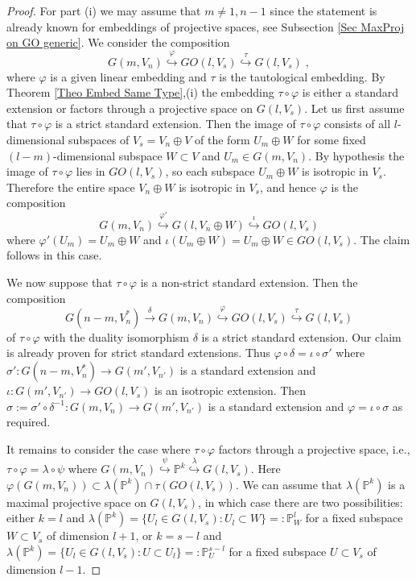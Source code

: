 \documentclass[12pt]{amsart}
\def\PP {{\mathbb P}}     %
\begin{document}
\begin{proof} For part (i) we may assume that $m\ne 1,n-1$ since the statement is already known for embeddings of projective spaces, see Subsection \ref{Sec MaxProj on GO generic}. We consider the composition
$$
G(m,V_n) \stackrel{\varphi}{\hookrightarrow} GO(l,V_s) \stackrel{\tau}{\hookrightarrow} G(l,V_s) \;,
$$
where $\varphi$ is a given linear embedding and $\tau$ is the tautological embedding. By Theorem \ref{Theo Embed Same Type},(i) the embedding $\tau\circ\varphi$ is either a standard extension or factors through a projective space on $G(l,V_s)$. Let us first assume that $\tau\circ\varphi$ is a strict standard extension. Then the image of $\tau\circ\varphi$ consists of all $l$-dimensional subspaces of $V_s=V_n\oplus V$ of the form $U_m\oplus W$ for some fixed $(l-m)$-dimensional subspace $W\subset V$ and $U_m\in G(m,V_n)$. By hypothesis the image of $\tau\circ\varphi$ lies in $GO(l,V_s)$, so each subspace $U_m\oplus W$ is isotropic in $V_s$. Therefore the entire space $V_n\oplus W$ is isotropic in $V_s$, and hence $\varphi$ is the composition
$$
G(m,V_n) \stackrel{\varphi'}{\hookrightarrow}  G(l,V_n\oplus W)\stackrel{\iota}{\hookrightarrow} GO(l,V_s)
$$
where $\varphi'(U_m)=U_m\oplus W$ and $\iota(U_m\oplus W)=U_m\oplus W \in GO(l,V_s)$. The claim follows in this case.

We now suppose that $\tau\circ\varphi$ is a non-strict standard extension. Then the composition
$$
G(n-m,V_n^*)\stackrel{\delta}{\to} G(m,V_n) \stackrel{\varphi}{\hookrightarrow} GO(l,V_s) \stackrel{\tau}{\hookrightarrow} G(l,V_s)
$$
of $\tau\circ\varphi$ with the duality isomorphism $\delta$ is a strict standard extension. Our claim is already proven for strict standard extensions. Thus $\varphi\circ\delta=\iota\circ\sigma'$ where $\sigma':G(n-m,V_n^*)\to G(m',V_{n'})$ is a standard extension and $\iota:G(m',V_{n'})\to GO(l,V_s)$ is an isotropic extension. Then $\sigma:=\sigma'\circ\delta^{-1}:G(m,V_n)\to G(m',V_{n'})$ is a standard extension and $\varphi=\iota\circ\sigma$ as required.

It remains to consider the case where $\tau\circ\varphi$ factors through a projective space, i.e., $\tau\circ\varphi=\lambda\circ\psi$ where $G(m,V_n)\stackrel{\psi}{\hookrightarrow} \PP^{k}\stackrel{\lambda}{\hookrightarrow} G(l,V_s)$. Here $\varphi(G(m,V_n))\subset \lambda(\PP^k)\cap \tau(GO(l,V_s))$. We can assume that $\lambda(\PP^k)$ is a maximal projective space on $G(l,V_s)$, in which case there are two possibilities: either $k=l$ and $\lambda(\PP^k)=\{U_l\in G(l,V_s):U_l\subset W\}=:\PP_W^{l}$ for a fixed subspace $W\subset V_s$ of dimension $l+1$, or $k=s-l$ and $\lambda(\PP^k)=\{U_l\in G(l,V_s):U\subset U_l\}=:\PP_U^{s-l}$ for a fixed subspace $U\subset V_s$ of dimension $l-1$. 


\end{proof}
\end{document}
